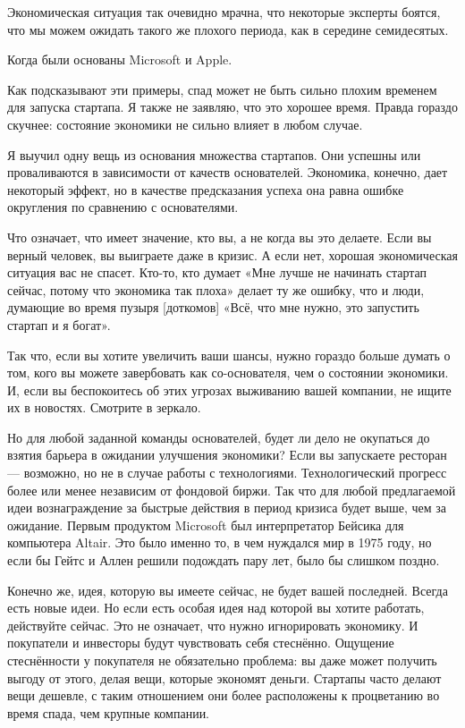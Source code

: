 \documentclass[ebook,12pt,oneside,openany]{memoir}
\author{Пол Грэм} \date{}
\begin{document}
\maketitle

Экономическая ситуация так очевидно мрачна, что некоторые эксперты
боятся, что мы можем ожидать такого же плохого периода, как в середине
семидесятых.

Когда были основаны Microsoft и Apple.

Как подсказывают эти примеры, спад может не быть сильно плохим
временем для запуска стартапа. Я также не заявляю, что это хорошее
время. Правда гораздо скучнее: состояние экономики не сильно влияет в
любом случае.

Я выучил одну вещь из основания множества стартапов. Они успешны или
проваливаются в зависимости от качеств основателей. Экономика,
конечно, дает некоторый эффект, но в качестве предсказания успеха она
равна ошибке округления по сравнению с основателями.

Что означает, что имеет значение, кто вы, а не когда вы это делаете.
Если вы верный человек, вы выиграете даже в кризис. А если нет,
хорошая экономическая ситуация вас не спасет. Кто-то, кто думает «Мне
лучше не начинать стартап сейчас, потому что экономика так плоха»
делает ту же ошибку, что и люди, думающие во время пузыря [доткомов]
«Всё, что мне нужно, это запустить стартап и я богат».

Так что, если вы хотите увеличить ваши шансы, нужно гораздо больше
думать о том, кого вы можете завербовать как со-основателя, чем о
состоянии экономики. И, если вы беспокоитесь об этих угрозах выживанию
вашей компании, не ищите их в новостях. Смотрите в зеркало.

Но для любой заданной команды основателей, будет ли дело не окупаться
до взятия барьера в ожидании улучшения экономики? Если вы запускаете
ресторан — возможно, но не в случае работы с технологиями.
Технологический прогресс более или менее независим от фондовой биржи.
Так что для любой предлагаемой идеи вознаграждение за быстрые действия
в период кризиса будет выше, чем за ожидание. Первым продуктом
Microsoft был интерпретатор Бейсика для компьютера Altair. Это было
именно то, в чем нуждался мир в 1975 году, но если бы Гейтс и Аллен
решили подождать пару лет, было бы слишком поздно.

Конечно же, идея, которую вы имеете сейчас, не будет вашей последней.
Всегда есть новые идеи. Но если есть особая идея над которой вы хотите
работать, действуйте сейчас. Это не означает, что нужно игнорировать
экономику. И покупатели и инвесторы будут чувствовать себя стеснённо.
Ощущение стеснённости у покупателя не обязательно проблема: вы даже
может получить выгоду от этого, делая вещи, которые экономят деньги.
Стартапы часто делают вещи дешевле, с таким отношением они более
расположены к процветанию во время спада, чем крупные компании.
\end{document}
